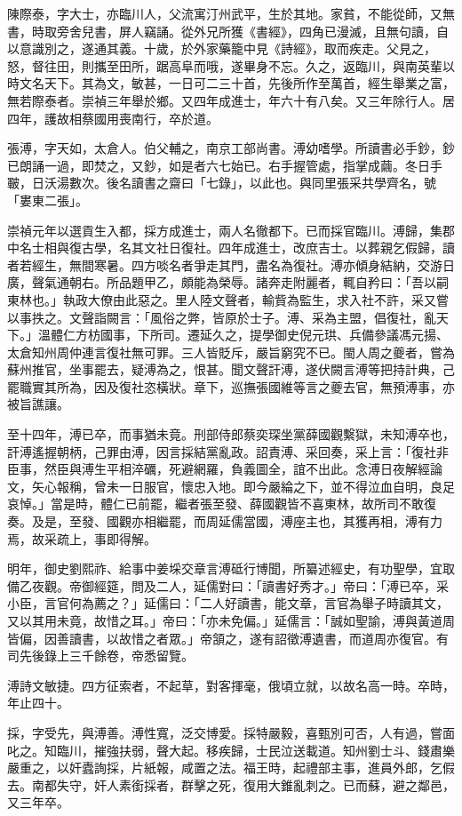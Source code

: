 \begin{pinyinscope}
陳際泰，字大士，亦臨川人，父流寓汀州武平，生於其地。家貧，不能從師，又無書，時取旁舍兒書，屏人竊誦。從外兄所獲《書經》，四角已漫滅，且無句讀，自以意識別之，遂通其義。十歲，於外家藥籠中見《詩經》，取而疾走。父見之，怒，督往田，則攜至田所，踞高阜而哦，遂畢身不忘。久之，返臨川，與南英輩以時文名天下。其為文，敏甚，一日可二三十首，先後所作至萬首，經生舉業之富，無若際泰者。崇禎三年舉於鄉。又四年成進士，年六十有八矣。又三年除行人。居四年，護故相蔡國用喪南行，卒於道。

張溥，字天如，太倉人。伯父輔之，南京工部尚書。溥幼嗜學。所讀書必手鈔，鈔已朗誦一過，即焚之，又鈔，如是者六七始已。右手握管處，指掌成繭。冬日手皸，日沃湯數次。後名讀書之齋曰「七錄」，以此也。與同里張采共學齊名，號「婁東二張」。

崇禎元年以選貢生入都，採方成進士，兩人名徹都下。已而採官臨川。溥歸，集郡中名士相與復古學，名其文社日復社。四年成進士，改庶吉士。以葬親乞假歸，讀者若經生，無間寒暑。四方啖名者爭走其門，盡名為復社。溥亦傾身結納，交游日廣，聲氣通朝右。所品題甲乙，頗能為榮辱。諸奔走附麗者，輒自矜曰：「吾以嗣東林也。」執政大僚由此惡之。里人陸文聲者，輸貲為監生，求入社不許，采又嘗以事抶之。文聲詣闕言：「風俗之弊，皆原於士子。溥、采為主盟，倡復社，亂天下。」溫體仁方枋國事，下所司。遷延久之，提學御史倪元珙、兵備參議馮元揚、太倉知州周仲連言復社無可罪。三人皆貶斥，嚴旨窮究不已。閩人周之夔者，嘗為蘇州推官，坐事罷去，疑溥為之，恨甚。聞文聲訐溥，遂伏闕言溥等把持計典，己罷職實其所為，因及復社恣橫狀。章下，巡撫張國維等言之夔去官，無預溥事，亦被旨譙讓。

至十四年，溥已卒，而事猶未竟。刑部侍郎蔡奕琛坐黨薛國觀繫獄，未知溥卒也，訐溥遙握朝柄，己罪由溥，因言採結黨亂政。詔責溥、采回奏，采上言：「復社非臣事，然臣與溥生平相淬礪，死避網羅，負義圖全，誼不出此。念溥日夜解經論文，矢心報稱，曾未一日服官，懷忠入地。即今嚴綸之下，並不得泣血自明，良足哀悼。」當是時，體仁已前罷，繼者張至發、薛國觀皆不喜東林，故所司不敢復奏。及是，至發、國觀亦相繼罷，而周延儒當國，溥座主也，其獲再相，溥有力焉，故采疏上，事即得解。

明年，御史劉熙祚、給事中姜埰交章言溥砥行博聞，所纂述經史，有功聖學，宜取備乙夜觀。帝御經筵，問及二人，延儒對曰：「讀書好秀才。」帝曰：「溥已卒，采小臣，言官何為薦之？」延儒曰：「二人好讀書，能文章，言官為舉子時讀其文，又以其用未竟，故惜之耳。」帝曰：「亦未免偏。」延儒言：「誠如聖諭，溥與黃道周皆偏，因善讀書，以故惜之者眾。」帝頷之，遂有詔徵溥遺書，而道周亦復官。有司先後錄上三千餘卷，帝悉留覽。

溥詩文敏捷。四方征索者，不起草，對客揮毫，俄頃立就，以故名高一時。卒時，年止四十。

採，字受先，與溥善。溥性寬，泛交博愛。採特嚴毅，喜甄別可否，人有過，嘗面叱之。知臨川，摧強扶弱，聲大起。移疾歸，士民泣送載道。知州劉士斗、錢肅樂嚴重之，以奸蠹詢採，片紙報，咸置之法。福王時，起禮部主事，進員外郎，乞假去。南都失守，奸人素銜採者，群擊之死，復用大錐亂刺之。已而蘇，避之鄰邑，又三年卒。


\end{pinyinscope}